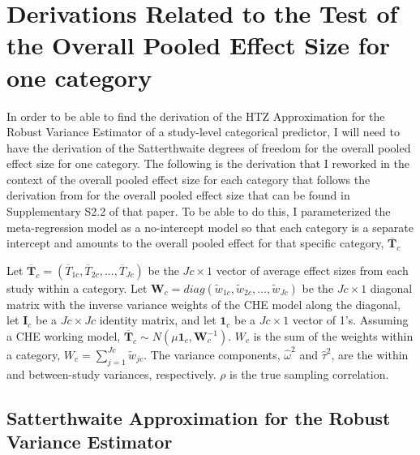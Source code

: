 

\chapter{Derivations Related to the Test of the Overall Pooled Effect Size for one category} \label{App: overallpooled}

In order to be able to find the derivation of the HTZ Approximation for the Robust Variance Estimator of a study-level categorical predictor, I will need to have the derivation of the Satterthwaite degrees of freedom for the overall pooled effect size for one category. The following is the derivation that I reworked in the context of the overall pooled effect size for each category that follows the derivation from \textcite{vembye2023} for the overall pooled effect size that can be found in Supplementary S2.2 of that paper. To be able to do this, I parameterized the meta-regression model as a no-intercept model so that each category is a separate intercept and amounts to the overall pooled effect for that specific category, $\overline{\bm{T}}_c$

Let $\overline{\bm{T}}_c = (\overline{T}_{1c}, \overline{T}_{2c}, ..., \overline{T}_{Jc})$ be the $Jc \times 1$ vector of average effect sizes from each study within a category. Let $\bm{W}_c = diag(\tilde{w}_{1c}, \tilde{w}_{2c}, ..., \tilde{w}_{Jc})$ be the $Jc \times 1$ diagonal matrix with the inverse variance weights of the CHE model along the diagonal,  let $\bm{I}_c$ be a $Jc \times Jc$ identity matrix, and let $\bm{1}_c$ be a $Jc \times 1$ vector of 1's. Assuming a CHE working model, $\overline{\bm{T}}_c \sim N(\mu \bm{1}_c, \bm{W}_c^{-1})$.   $W_c$ is the sum of the weights within a category, $W_c = \sum_{j=1}^{Jc} \tilde{w}_{jc}$. The variance components, $\hat{\omega}^2$ and $\hat{\tau}^2$, are the within and between-study variances, respectively. $\rho$ is the true sampling correlation.





\section{Satterthwaite Approximation for the Robust Variance Estimator}

